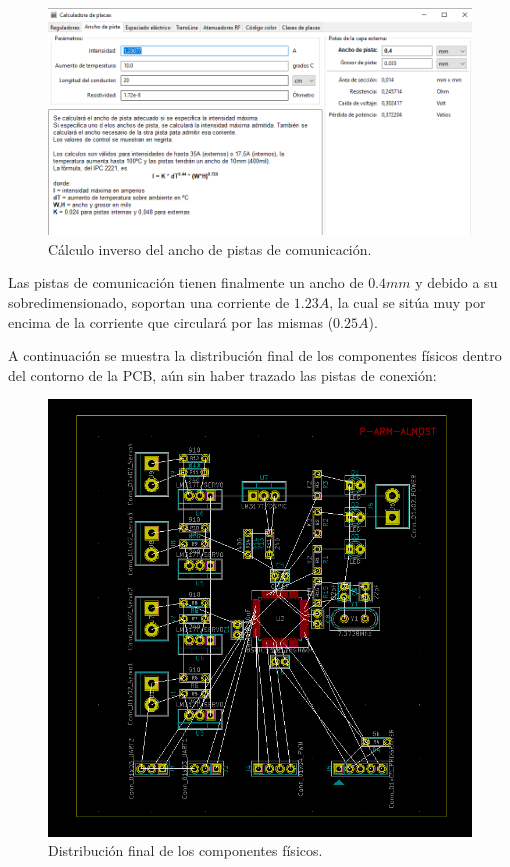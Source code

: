 \begin{figure}[H]
\centering 
\includegraphics[width=0.9\linewidth]{pictures/AnchoPistaResto.PNG}
\caption{Cálculo inverso del ancho de pistas de comunicación.}
\label{fig:Calculo_Inverso}
\end{figure}

Las pistas de comunicación tienen finalmente un ancho de $0.4mm$ y debido a su sobredimensionado, soportan una corriente de $1.23A$, la cual se sitúa muy por encima de la corriente que circulará por las mismas ($0.25A$).

A continuación se muestra la distribución final de los componentes físicos dentro del contorno de la \ac{PCB}, aún sin haber trazado las pistas de conexión:

\begin{figure}[H]
\centering
\includegraphics[width=0.9\linewidth]{pictures/DistribucionInicial.PNG}
\caption{Distribución final de los componentes físicos.}
\label{fig:Distribución final}
\end{figure}

